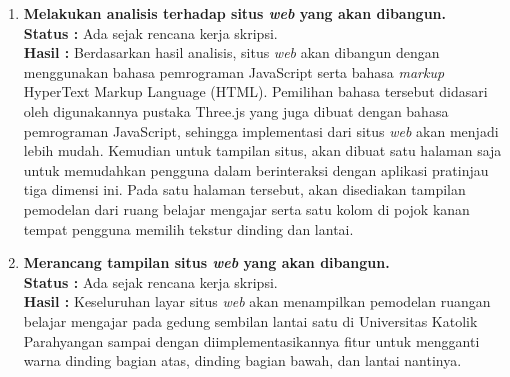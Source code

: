 \documentclass[a4paper,twoside]{article}
\begin{document}
\begin{enumerate}
		\item \textbf{Melakukan analisis terhadap situs \textit{\textbf{web}} yang akan dibangun.}\\
		{\bf Status :} Ada sejak rencana kerja skripsi.\\
		{\bf Hasil :} Berdasarkan hasil analisis, situs {\it web} akan dibangun dengan menggunakan bahasa pemrograman JavaScript serta bahasa {\it markup} HyperText Markup Language (HTML). Pemilihan bahasa tersebut didasari oleh digunakannya pustaka Three.js yang juga dibuat dengan bahasa pemrograman JavaScript, sehingga implementasi dari situs {\it web} akan menjadi lebih mudah. Kemudian untuk tampilan situs, akan dibuat satu halaman saja untuk memudahkan pengguna dalam berinteraksi dengan aplikasi pratinjau tiga dimensi ini. Pada satu halaman tersebut, akan disediakan tampilan pemodelan dari ruang belajar mengajar serta satu kolom di pojok kanan tempat pengguna memilih tekstur dinding dan lantai. 

		\item \textbf{Merancang tampilan situs \textit{\textbf{web}} yang akan dibangun.}\\
		{\bf Status :} Ada sejak rencana kerja skripsi.\\
		{\bf Hasil :} Keseluruhan layar situs {\it web} akan menampilkan pemodelan ruangan belajar mengajar pada gedung sembilan lantai satu di Universitas Katolik Parahyangan sampai dengan diimplementasikannya fitur untuk mengganti warna dinding bagian atas, dinding bagian bawah, dan lantai nantinya.
		

\end{enumerate}
\end{document}
